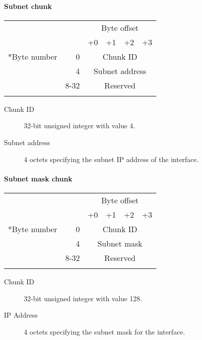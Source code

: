 \documentclass[a4paper,12pt]{report}
\begin{document}
\paragraph{Subnet chunk}
\begin{center}
\begin{tabular}{r r | m{1in} | m{1in} | m{1in} | m{1in} |}
 & & \multicolumn{4}{c}{Byte offset} \\
 & & +0 & +1 & +2 & +3 \\
\hhline{~-----}
\multirow{3}*{Byte number} & 0 & \multicolumn{4}{c|}{Chunk ID} \\
\hhline{~~----}
 & 4 & \multicolumn{4}{c|}{Subnet address} \\
\hhline{~~----}
 & 8-32 & \multicolumn{4}{c|}{Reserved} \\
\hhline{~~----}
\end{tabular}
\end{center}
\begin{description}
\item[Chunk ID]  32-bit unsigned integer with value 4.
\item[Subnet address]  4 octets specifying the subnet IP address of the interface.
\end{description}

\paragraph{Subnet mask chunk}
\begin{center}
\begin{tabular}{r r | m{1in} | m{1in} | m{1in} | m{1in} |}
 & & \multicolumn{4}{c}{Byte offset} \\
 & & +0 & +1 & +2 & +3 \\
\hhline{~-----}
\multirow{3}*{Byte number} & 0 & \multicolumn{4}{c|}{Chunk ID} \\
\hhline{~~----}
 & 4 & \multicolumn{4}{c|}{Subnet mask} \\
\hhline{~~----}
 & 8-32 & \multicolumn{4}{c|}{Reserved} \\
\hhline{~~----}
\end{tabular}
\end{center}
\begin{description}
\item[Chunk ID]  32-bit unsigned integer with value 128.
\item[IP Address]  4 octets specifying the subnet mask for the interface.
\end{description}
\end{document}

